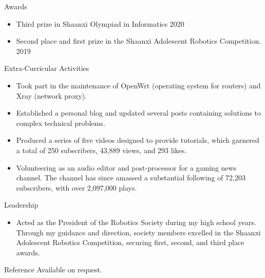 \documentclass{resume} %
\begin{document}
\begin{rSection}{Awards} 
\begin{itemize}
    \item Third prize in Shaanxi Olympiad in Informatics \hfill 2020
    \item Second place and first prize in the Shaanxi Adolescent Robotics Competition. \hfill 2019
\end{itemize}
\end{rSection}
\begin{rSection}{Extra-Curricular Activities} 
\begin{itemize}
    \item 	Took part in the maintenance of OpenWrt (operating system for routers) and Xray (network proxy).
    \item	Established a personal blog and updated several posts containing solutions to complex technical problems.
    \item   Produced a series of five videos designed to provide tutorials, which garnered a total of 250 subscribers, 43,889 views, and 293 likes.
    \item   Volunteering as an audio editor and post-processor for a gaming news channel. The channel has since amassed a substantial following of 72,203 subscribers, with over 2,097,000 plays.
\end{itemize}
\end{rSection}

\begin{rSection}{Leadership} 
\begin{itemize}
    \item Acted as the President of the Robotics Society during my high school years. Through my guidance and direction, society members excelled in the Shaanxi Adolescent Robotics Competition, securing first, second, and third place awards.
\end{itemize}
\end{rSection}

\begin{rSection}{Reference} 
    Available on request.
\end{rSection}
\end{document}
